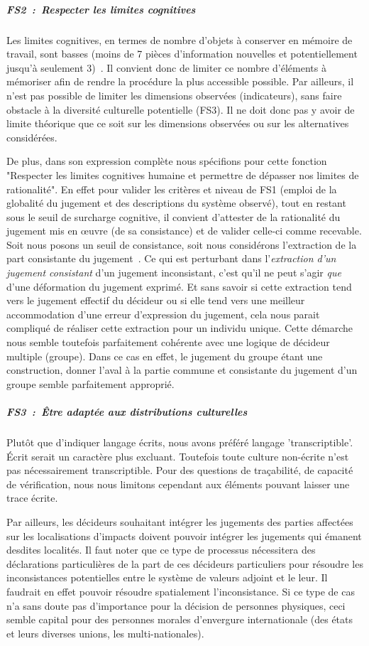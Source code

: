\subparagraph{FS2~:~Respecter les limites cognitives}
Les limites cognitives, en termes de nombre d'objets à conserver en mémoire de travail, sont basses (moins de 7 pièces d'information nouvelles et potentiellement jusqu'à seulement 3)~\cite{farrington_seven_2011}.
Il convient donc de limiter ce nombre d'éléments à mémoriser afin de rendre la procédure la plus accessible possible.
Par ailleurs, il n'est pas possible de limiter les dimensions observées (indicateurs), sans faire obstacle à la diversité culturelle potentielle (FS3).
Il ne doit donc pas y avoir de limite théorique que ce soit sur les dimensions observées ou sur les alternatives considérées.

De plus, dans son expression complète nous spécifions pour cette fonction "Respecter les limites cognitives humaine et permettre de dépasser nos limites de rationalité".
En effet pour valider les critères et niveau de FS1 (emploi de la globalité du jugement et des descriptions du système observé), tout en restant sous le seuil de surcharge cognitive, il convient d'attester de la rationalité du jugement mis en œuvre (de sa consistance) et de valider celle-ci comme recevable.
Soit nous posons un seuil de consistance, soit nous considérons l'extraction de la part consistante du jugement~\cite{barzilai_consistency_1998}.
Ce qui est perturbant dans l'\emph{extraction d'un jugement consistant} d'un jugement inconsistant, c'est qu'il ne peut s'agir \emph{que} d'une déformation du jugement exprimé.
Et sans savoir si cette extraction tend vers le jugement effectif du décideur ou si elle tend vers une meilleur accommodation d'une erreur d'expression du jugement, cela nous parait compliqué de réaliser cette extraction pour un individu unique.
Cette démarche nous semble toutefois parfaitement cohérente avec une logique de décideur multiple (groupe).
Dans ce cas en effet, le jugement du groupe étant une construction, donner l'aval à la partie commune et consistante du jugement d'un groupe semble parfaitement approprié.
\subparagraph{FS3~:~Être adaptée aux distributions culturelles}

Plutôt que d'indiquer langage écrits, nous avons préféré langage 'transcriptible'.
Écrit serait un caractère plus excluant.
Toutefois toute culture non-écrite n'est pas nécessairement transcriptible.
Pour des questions de traçabilité, de capacité de vérification, nous nous limitons cependant aux éléments pouvant laisser une trace écrite.
 
Par ailleurs, les décideurs souhaitant intégrer les jugements des parties affectées sur les localisations d'impacts doivent pouvoir intégrer les jugements qui émanent desdites localités.
Il faut noter que ce type de processus nécessitera des déclarations particulières de la part de ces décideurs particuliers pour résoudre les inconsistances potentielles entre le système de valeurs adjoint et le leur.
Il faudrait en effet pouvoir résoudre spatialement l'inconsistance.
Si ce type de cas n'a sans doute pas d'importance pour la décision de personnes physiques, ceci semble capital pour des personnes morales d'envergure internationale (des états et leurs diverses unions, les multi-nationales).

